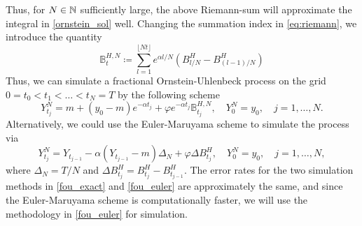 Thus, for $N\in\mathbb{N}$ sufficiently large, the above Riemann-sum will approximate the integral in \eqref{ornstein_sol} well. Changing the summation index in \eqref{eq:riemann}, we introduce the quantity
\begin{equation}
    \mathbb{B}_{t}^{H,N}\coloneqq \sum_{l=1}^{\lfloor Nt\rfloor }e^{\alpha l/N}\left(B^{H}_{l/N}-B^{H}_{(l-1)/N}\right)
\end{equation}
Thus, we can simulate a fractional Ornstein-Uhlenbeck process on the grid $0=t_{0}<t_{1}<\dots<t_{N}=T$ by the following scheme
\begin{equation}\label{fou_exact}
    Y_{t_{j}}^{N}=m + (y_{0}-m)e^{-\alpha t_{j}} + \varphi e^{-\alpha t_{j}}\mathbb{B}_{t_{j}}^{H,N},\quad Y_{0}^{N}=y_{0}, \quad j=1,\dots,N.
\end{equation}
Alternatively, we could use the Euler-Maruyama scheme to simulate the process via
\begin{equation}\label{fou_euler}
    Y_{t_{j}}^{N}=Y_{t_{j-1}} -\alpha(Y_{t_{j-1}}-m)\Delta_{N} + \varphi\Delta B_{t_{j}}^{H},\quad Y_{0}^{N}=y_{0},\quad j=1,\dots,N,
\end{equation}
where $\Delta_{N}=T/N$ and $\Delta B_{t_{j}}^{H}=B^{H}_{t_{j}}-B^{H}_{t_{j-1}}$. The error rates for the two simulation methods in \eqref{fou_exact} and \eqref{fou_euler} are approximately the same, and since the Euler-Maruyama scheme is computationally faster, we will use the methodology in \eqref{fou_euler} for simulation.

